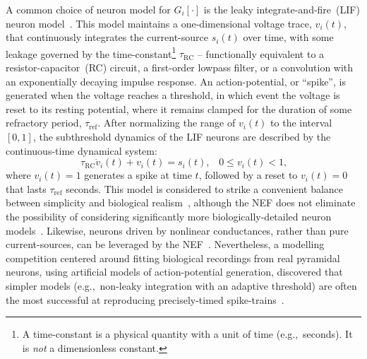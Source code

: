 A common choice of neuron model for $G_i\left[ \cdot \right]$ is the leaky integrate-and-fire~(LIF) neuron model~\citep{koch1998methods}.
This model maintains a one-dimensional voltage trace, $v_i(t)$, that continuously integrates the current-source $s_i(t)$ over time, with some leakage governed by the time-constant\footnote{A time-constant is a physical quantity with a unit of time (e.g.,~seconds). It is \emph{not} a dimensionless constant.} $\tau_\text{RC}$ -- functionally equivalent to a resistor-capacitor~(RC) circuit, a first-order lowpass filter, or a convolution with an exponentially decaying impulse response.
An action-potential, or ``spike'', is generated when the voltage reaches a threshold, in which event the voltage is reset to its resting potential, where it remains clamped for the duration of some refractory period, $\tau_\text{ref}$.
After normalizing the range of $v_i(t)$ to the interval $[0, 1]$, the subthreshold dynamics of the LIF neurons are described by the continuous-time dynamical system:
\begin{equation} \label{eq:lif-model}
\tau_\text{RC} \dot{v}_i(t) + v_i(t) = s_i(t) \text{,} \quad 0 \le v_i(t) < 1 \text{,}
\end{equation}
where $v_i(t) = 1$ generates a spike at time $t$, followed by a reset to $v_i(t) = 0$ that lasts $\tau_\text{ref}$ seconds.
This model is considered to strike a convenient balance between simplicity and biological realism~\citep[][pp.~81--82,~88-89]{eliasmith2003a}, although the NEF does not eliminate the possibility of considering significantly more biologically-detailed neuron models~\citep{duggins2017incorporating}.
Likewise, neurons driven by nonlinear conductances, rather than pure current-sources, can be leveraged by the NEF~\citep{stoeckel2018}.
Nevertheless, a modelling competition centered around fitting biological recordings from real pyramidal neurons, using artificial models of action-potential generation, discovered that simpler models (e.g.,~non-leaky integration with an adaptive threshold) are often the most successful at reproducing precisely-timed spike-trains~\citep{gerstner2009good}.

